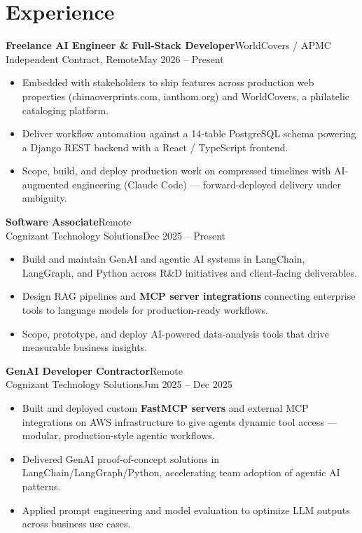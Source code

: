 \documentclass[10pt]{article}
\newcommand{\dentry}[4]{\noindent\textbf{#1}\hfill{#2}\\{#3}\hfill{#4}\par}
\begin{document}
\section*{Experience}
\dentry{Freelance AI Engineer \& Full-Stack Developer}{WorldCovers / APMC}{Independent Contract, Remote}{May 2026 – Present}
\begin{itemize}
  \item Embedded with stakeholders to ship features across production web properties (chinaoverprints.com, ianthom.org) and WorldCovers, a philatelic cataloging platform.
  \item Deliver workflow automation against a 14-table PostgreSQL schema powering a Django REST backend with a React / TypeScript frontend.
  \item Scope, build, and deploy production work on compressed timelines with AI-augmented engineering (Claude Code) — forward-deployed delivery under ambiguity.
\end{itemize}
\dentry{Software Associate}{Remote}{Cognizant Technology Solutions}{Dec 2025 – Present}
\begin{itemize}
  \item Build and maintain GenAI and agentic AI systems in LangChain, LangGraph, and Python across R\&D initiatives and client-facing deliverables.
  \item Design RAG pipelines and \textbf{MCP server integrations} connecting enterprise tools to language models for production-ready workflows.
  \item Scope, prototype, and deploy AI-powered data-analysis tools that drive measurable business insights.
\end{itemize}
\dentry{GenAI Developer Contractor}{Remote}{Cognizant Technology Solutions}{Jun 2025 – Dec 2025}
\begin{itemize}
  \item Built and deployed custom \textbf{FastMCP servers} and external MCP integrations on AWS infrastructure to give agents dynamic tool access — modular, production-style agentic workflows.
  \item Delivered GenAI proof-of-concept solutions in LangChain/LangGraph/Python, accelerating team adoption of agentic AI patterns.
  \item Applied prompt engineering and model evaluation to optimize LLM outputs across business use cases.
\end{itemize}
\end{document}
